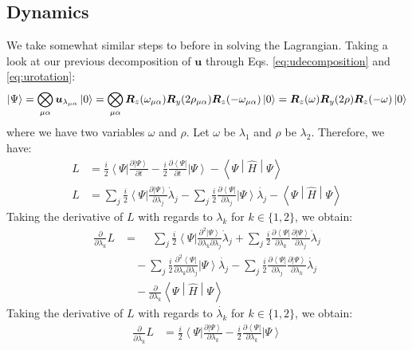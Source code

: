 \documentclass{aux/ttuthes2007}
\newcommand{\bra}[1]{\ensuremath{\left\langle#1\right\vert}}
\newcommand{\ket}[1]{\ensuremath{\left|#1\right\rangle}}
\newcommand{\sandwich}[3]{\left< #1 \middle\vert #2 \middle\vert #3 \right>}
\newcommand{\pd}[1]{\frac{\partial}{\partial #1}}
\newcommand{\kpp}[1]{\frac{\partial \ket\Psi}{\partial #1}}
\newcommand{\bpp}[1]{\frac{\partial \bra\Psi}{\partial #1}}
\newcommand{\kppd}[2]{\frac{\partial^{2} \ket\Psi}{\partial #1 \partial #2}}
\newcommand{\bppd}[2]{\frac{\partial^{2} \bra\Psi}{\partial #1 \partial #2}}
\newcommand{\ind}[1]{{\uo #1 \oo #1}}
\newcommand{\uo}[1]{
		\IfEqCase{#1}{
			{0}{\mu}
			{1}{\nu}
			{2}{\xi}
		}[\PackageError{uo}{Undefined option to uo: #1}{}]
}
\newcommand{\oo}[1]{
		\IfEqCase{#1}{
			{0}{\alpha}
			{1}{\beta}
			{2}{\gamma}
		}[\PackageError{unocorb}{Undefined option to unuo: #1}{}]
}
\begin{document}
\subsection {\textbf{Dynamics}}
%
We take somewhat similar steps to before in solving the Lagrangian. Taking a look at our previous decomposition of $\bm u$ through Eqs. \ref{eq:udecomposition} and \ref{eq:urotation}:
\begin{equation*}
\begin{split}
	\ket\Psi 
	= \bigotimes_{\ind 0} 
		\bm u_{\lambda_{\ind 0}} \ket 0
	= \bigotimes_{\ind 0} 
		\bm R_z(\omega_{\ind 0}) \bm R_y(2\rho_\ind 0) \bm R_z(-\omega_\ind 0) \ket 0
	= \bm R_z(\omega) \bm R_y(2\rho) \bm R_z(-\omega) \ket 0
\end{split}
\end{equation*}
%
where we have two variables $\omega$ and $\rho$. Let $\omega$ be $\lambda_1$ and $\rho$ be $\lambda_2$. Therefore, we have:
%
\begin{equation*}
	\begin{split}
		L &= \frac{i}{2}\bra{\Psi}{\kpp t} - \frac{i}{2}{\bpp{t}}\ket{\Psi} - \sandwich{\Psi}{\hat H}{\Psi} \\
	L &= 	
		\sum_j \frac{i}{2}\bra{\Psi}{\kpp {\lambda_j}} \dot \lambda_j
	- 	\sum_j \frac{i}{2}{\bpp{\lambda_j}}\ket{\Psi}\dot{\lambda_j}
	- \sandwich{\Psi}{\hat H}{\Psi}
	\end{split}
\end{equation*}
%
Taking the derivative of $L$ with regards to $\lambda_k$ for $k \in \{1, 2\}$, we obtain:
%
\begin{equation*}
	\begin{split}
	\pd{\lambda_k} L &= 	
	\phantom{-}\sum_j \frac{i}{2}\bra{\Psi}{\kppd {\lambda_k}{\lambda_j}} \dot \lambda_j
	+	\sum_j \frac{i}{2}\bpp{\lambda_k}{\kpp {\lambda_j}} \dot \lambda_j \\
	&\quad -\sum_j \frac{i}{2}{\bppd{\lambda_k}{\lambda_j}}\ket{\Psi}\dot{\lambda_j}
	- 	\sum_j \frac{i}{2}{\bpp{\lambda_j}}\kpp{\lambda_k}\dot{\lambda_j}\\
	&\quad -\pd{\lambda_k} \sandwich{\Psi}{\hat H}{\Psi}
	\end{split}
\end{equation*}
%
Taking the derivative of $L$ with regards to $\dot{\lambda_k}$ for $k \in \{1, 2\}$, we obtain:
%
\begin{equation*}
	\begin{split}
		\pd{\dot{\lambda_k}} L &=
		\frac{i}{2}\bra{\Psi}{\kpp {\lambda_k}}
	- 	\frac{i}{2}{\bpp{\lambda_k}}\ket{\Psi}
	\end{split}
\end{equation*}
\end{document}

